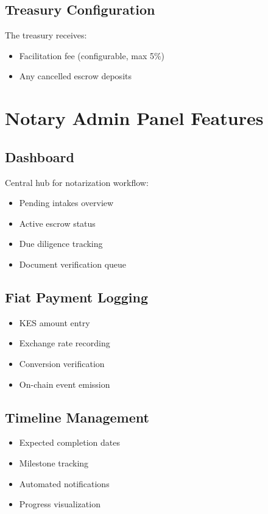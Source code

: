 \documentclass[12pt,a4paper]{article}
\begin{document}
\subsection{Treasury Configuration}
The treasury receives:
\begin{itemize}
\item Facilitation fee (configurable, max 5\%)
\item Any cancelled escrow deposits
\end{itemize}

\section{Notary Admin Panel Features}

\subsection{Dashboard}
Central hub for notarization workflow:
\begin{itemize}
\item Pending intakes overview
\item Active escrow status
\item Due diligence tracking
\item Document verification queue
\end{itemize}

\subsection{Fiat Payment Logging}
\begin{itemize}
\item KES amount entry
\item Exchange rate recording
\item Conversion verification
\item On-chain event emission
\end{itemize}

\subsection{Timeline Management}
\begin{itemize}
\item Expected completion dates
\item Milestone tracking
\item Automated notifications
\item Progress visualization
\end{itemize}
\end{document}

